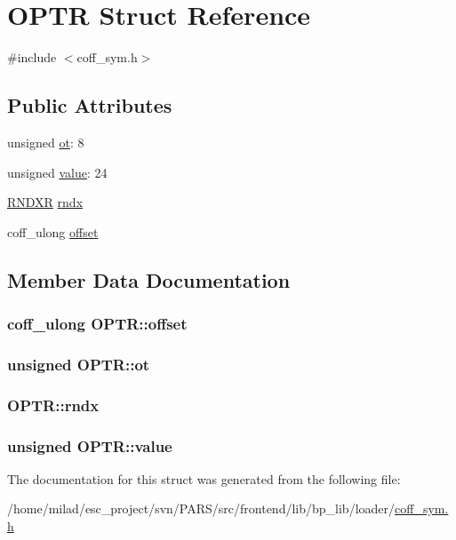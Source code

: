 \hypertarget{structOPTR}{
\section{OPTR Struct Reference}
\label{structOPTR}
}


{\ttfamily \#include $<$coff\_\-sym.h$>$}

\subsection*{Public Attributes}
\begin{DoxyCompactItemize}
\item 
unsigned \hyperlink{structOPTR_a395372ba2e7eb725906f228749c39dd5}{ot}: 8
\item 
unsigned \hyperlink{structOPTR_a6539af4ff0b28e701633de620abfabbe}{value}: 24
\item 
\hyperlink{structRNDXR}{RNDXR} \hyperlink{structOPTR_a3894af1c17210c3c3e33577ef34161fa}{rndx}
\item 
coff\_\-ulong \hyperlink{structOPTR_af59ba1a417a747c35426cb6edd3c3a7a}{offset}
\end{DoxyCompactItemize}


\subsection{Member Data Documentation}
\hypertarget{structOPTR_af59ba1a417a747c35426cb6edd3c3a7a}{
\subsubsection[{offset}]{\setlength{\rightskip}{0pt plus 5cm}coff\_\-ulong {\bf OPTR::offset}}}
\label{structOPTR_af59ba1a417a747c35426cb6edd3c3a7a}
\hypertarget{structOPTR_a395372ba2e7eb725906f228749c39dd5}{
\subsubsection[{ot}]{\setlength{\rightskip}{0pt plus 5cm}unsigned {\bf OPTR::ot}}}
\label{structOPTR_a395372ba2e7eb725906f228749c39dd5}
\hypertarget{structOPTR_a3894af1c17210c3c3e33577ef34161fa}{
\subsubsection[{rndx}]{ {\bf OPTR::rndx}}}
\label{structOPTR_a3894af1c17210c3c3e33577ef34161fa}
\hypertarget{structOPTR_a6539af4ff0b28e701633de620abfabbe}{
\subsubsection[{value}]{\setlength{\rightskip}{0pt plus 5cm}unsigned {\bf OPTR::value}}}
\label{structOPTR_a6539af4ff0b28e701633de620abfabbe}


The documentation for this struct was generated from the following file:\begin{DoxyCompactItemize}
\item 
/home/milad/esc\_\-project/svn/PARS/src/frontend/lib/bp\_\-lib/loader/\hyperlink{coff__sym_8h}{coff\_\-sym.h}\end{DoxyCompactItemize}
